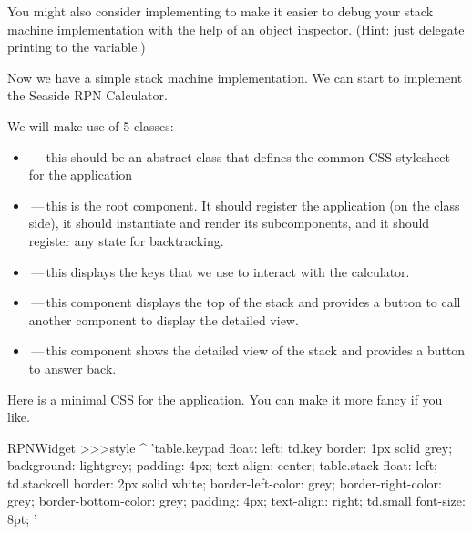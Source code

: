 \documentclass[a4paper,10pt,twoside]{book}
\begin{document}
You might also consider implementing  to make it easier to debug your stack machine implementation with the help of an object inspector.
(Hint: just delegate printing to the  variable.)


Now we have a simple stack machine implementation.
We can start to implement the Seaside RPN Calculator.

We will make use of 5 classes:
\begin{itemize}
  \item {}\,---\,this should be an abstract class that defines the common CSS stylesheet for the application
  \item {}\,---\,this is the root component.
  It should register the application (on the class side), it should instantiate and render its subcomponents, and it should register any state for backtracking.
  \item {}\,---\,this displays the keys that we use to interact with the calculator.
  \item {}\,---\,this component displays the top of the stack and provides a button to call another component to display the detailed view.
  \item {}\,---\,this component shows the detailed view of the stack and provides a button to answer back.
\end{itemize}


Here is a minimal CSS for the application.
You can make it more fancy if you like.
\begin{code}{}
RPNWidget >>>style
	^ 'table.keypad { float: left; }
td.key {
	border: 1px solid grey;
	background: lightgrey;
	padding: 4px;
	text-align: center;
}
table.stack { float: left; }
td.stackcell {
	border: 2px solid white;
	border-left-color: grey;
	border-right-color: grey;
	border-bottom-color: grey;
	padding: 4px;
	text-align: right;
}
td.small { font-size: 8pt; }'
\end{code}

\end{document}

